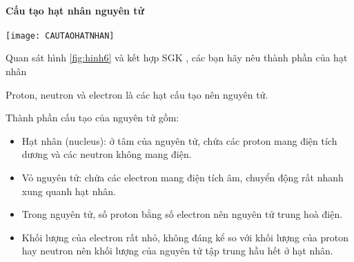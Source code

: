 \paragraph{Cấu tạo hạt nhân nguyên tử}
\begin{center}
	\texttt{[image: CAUTAOHATNHAN]}\\
	\label{fig:hinh6}
\end{center}
\begin{hoivadap}
	Quan sát hình \ref{fig:hinh6} và kết hợp SGK , các bạn hãy nêu thành phần của hạt nhân
\end{hoivadap}
\begin{hoplythuyet}
	Proton, neutron và electron là các hạt cấu tạo nên nguyên tử.
\end{hoplythuyet}
\begin{tongket}
	Thành phần cấu tạo của nguyên tử gồm:
\begin{itemize}
	\item  Hạt nhân (nucleus): ở tâm của nguyên tử, chứa các proton mang điện tích dương và các neutron không mang điện.
	\item Vỏ nguyên tử: chứa các electron mang điện tích âm, chuyển động rất nhanh xung quanh hạt nhân.
	\item Trong nguyên tử, số proton bằng số electron nên nguyên tử trung hoà điện.
	\item Khối lượng của electron rất nhỏ, không đáng kể so với khối lượng của proton hay neutron nên khối lượng của nguyên tử tập trung hầu hết ở hạt nhân.
\end{itemize}
\end{tongket}


